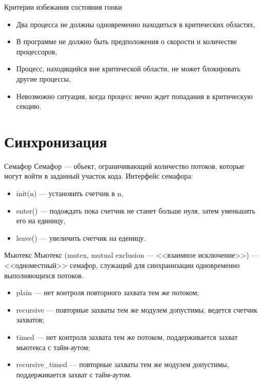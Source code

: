 \begin{frame}{Критерии избежания состояния гонки}
\begin{itemize}
    \item Два процесса не должны одновременно находиться в критических областях,
    \item В программе не должно быть предположения о скорости и количестве
    процессоров,
    \item Процесс, находящийся вне критической области, не может блокировать
    другие процессы,
    \item Невозможно ситуация, когда процесс вечно ждет попадания в критическую
    секцию.
\end{itemize}
\end{frame}

\section{Синхронизация}

\begin{frame}{Семафор}
Семафор --- объект, ограничивающий количество потоков, которые могут войти в заданный участок кода.
\vfill
Интерфейс семафора:
\begin{itemize}
    \item init(n) --- установить счетчик в n,
    \item enter() --- подождать пока счетчик не станет больше нуля, затем уменьшить его на единицу,
    \item leave() --- увеличить счетчик на еденицу.
\end{itemize}
\end{frame}

\begin{frame}{Мьютекс}
Мьютекс (\abbr mutex, mutual exclusion --- <<взаимное исключение>>) --- <<одноместный>> семафор, служащий для синхранизации одновременно выполняющихся потоков.
\vfill
\begin{itemize}
    \item plain --- нет контроля повторного захвата тем же потоком;
    \item recursive --- повторные захваты тем же модулем допустимы, ведется
    счетчик захватов;
    \item timed --- нет контроля захвата тем же потоком, поддерживается захват
    мьютекса с тайм-аутом;
    \item recursive\_timed --- повторные захваты тем же модулем допустимы,
    поддерживается захват с тайм-аутом.
\end{itemize}
\end{frame}

